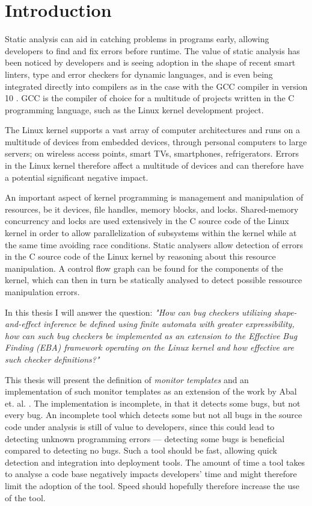 \section{Introduction}

\newpar Static analysis can aid in catching problems in programs early, allowing developers to find and fix errors before runtime. The value of static analysis has been noticed by developers and is seeing adoption in the shape of recent smart linters, type and error checkers for dynamic languages, and is even being integrated directly into compilers as in the case with the GCC compiler in version 10 \cite{gcc10}. GCC is the compiler of choice for a multitude of projects written in the C programming language, such as the Linux kernel development project. 

\newpar The Linux kernel supports a vast array of computer architectures and runs on a multitude of devices from embedded devices, through personal computers to large servers; on wireless access points, smart TVs, smartphones, refrigerators. Errors in the Linux kernel therefore affect a multitude of devices and can therefore have a potential significant negative impact.

\newpar An important aspect of kernel programming is management and manipulation of resources, be it devices, file handles, memory blocks, and locks. Shared-memory concurrency and locks are used extensively in the C source code of the Linux kernel in order to allow parallelization of subsystems within the kernel while at the same time avoiding race conditions. Static analysers allow detection of errors in the C source code of the Linux kernel by reasoning about this resource manipulation. A control flow graph can be found for the components of the kernel, which can then in turn be statically analysed to detect possible ressource manipulation errors. 

\newpar In this thesis I will answer the question: \textit{"How can bug checkers utilizing shape-and-effect inference be defined using finite automata with greater expressibility, how can such bug checkers be implemented as an extension to the Effective Bug Finding (EBA) framework operating on the Linux kernel and how effective are such checker definitions?"}

\newpar This thesis will present the definition of \textit{monitor templates} and an implementation of such monitor templates as an extension of the work by Abal et. al. \cite{Abal2017EffectiveBF}. The implementation is incomplete, in that it detects some bugs, but not every bug. An incomplete tool which detects some but not all bugs in the source code under analysis is still of value to developers, since this could lead to detecting unknown programming errors --- detecting some bugs is beneficial compared to detecting no bugs. Such a tool should be fast, allowing quick detection and integration into deployment tools. The amount of time a tool takes to analyse a code base negatively impacts developers' time and might therefore limit the adoption of the tool. Speed should hopefully therefore increase the use of the tool. 

